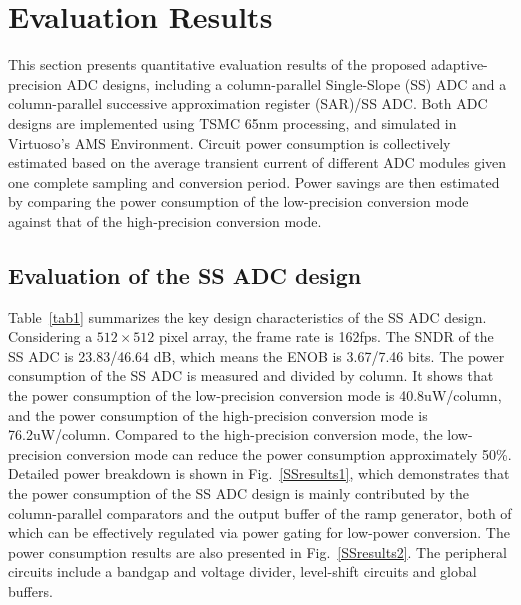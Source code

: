 \section{Evaluation Results}\label{result}

This section presents quantitative evaluation results of the proposed adaptive-precision ADC 
designs, including a column-parallel Single-Slope (SS) ADC and a column-parallel successive 
approximation register (SAR)/SS ADC. Both ADC designs are implemented using TSMC 65nm processing,
and simulated in Virtuoso’s AMS Environment. Circuit power consumption is collectively estimated
based on the average transient current of different ADC modules given one complete sampling and 
conversion period. Power savings are then estimated by comparing the power consumption of the
low-precision conversion mode against that of the high-precision conversion mode. 

\subsection{Evaluation of the SS ADC design}
Table~\ref{tab1} summarizes the key design characteristics of the SS ADC design. Considering a 
$512\times512$ pixel array, the frame rate is 162fps.  The SNDR of the SS ADC is 23.83/46.64 dB, 
which means the ENOB is 3.67/7.46 bits.  The power consumption of the SS ADC is measured and 
divided by column. It shows that the power consumption of the low-precision conversion mode is 
40.8uW/column, and the power consumption of the high-precision conversion mode is 76.2uW/column. 
Compared to the high-precision conversion mode, the low-precision conversion mode can reduce 
the power consumption approximately 50\%. Detailed power breakdown is shown in Fig.~\ref{SSresults1},
which demonstrates that the power consumption of the SS ADC design is mainly contributed by 
the  column-parallel comparators and the output buffer of the ramp generator, both of which 
can be effectively regulated via power gating for low-power conversion. The power consumption
results are also presented in Fig.~\ref{SSresults2}. The peripheral circuits include a bandgap 
and voltage divider, level-shift circuits and global buffers.


